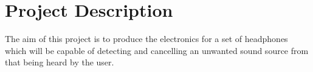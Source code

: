 \section{Project Description}
The aim of this project is to produce the electronics for a set of headphones which will be capable of detecting and cancelling an unwanted sound source from that being heard by the user.
